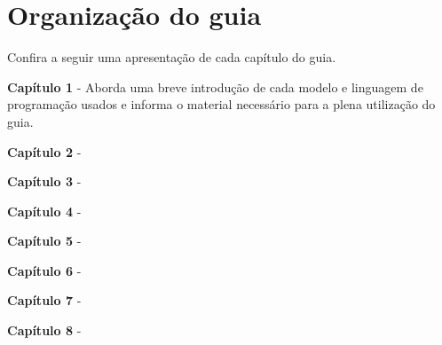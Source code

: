 \chapter*{Organização do guia}

\noindent Confira a seguir uma apresentação de cada capítulo do guia.
\bigskip

\noindent \textbf{Capítulo 1} - Aborda uma breve introdução de cada modelo e linguagem de programação usados e informa o material necessário para a plena utilização do guia.
\bigskip

\noindent \textbf{Capítulo 2} -
\bigskip

\noindent \textbf{Capítulo 3} -
\bigskip

\noindent \textbf{Capítulo 4} -
\bigskip

\noindent \textbf{Capítulo 5} -
\bigskip

\noindent \textbf{Capítulo 6} -
\bigskip

\noindent \textbf{Capítulo 7} -
\bigskip

\noindent \textbf{Capítulo 8} -
\bigskip
